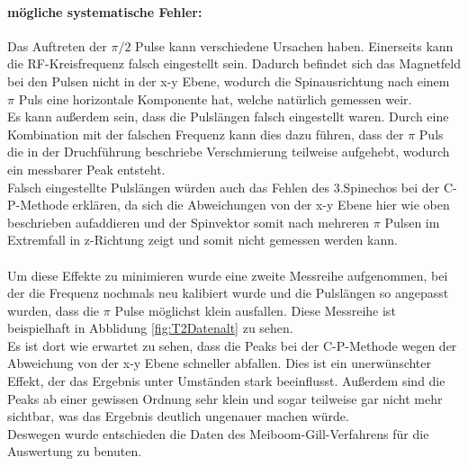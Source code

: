 \documentclass[12pt,a4paper]{article}
\begin{document}
\paragraph{mögliche systematische Fehler:}

Das Auftreten der $\pi/2$ Pulse kann verschiedene Ursachen haben. Einerseits kann die RF-Kreisfrequenz falsch eingestellt sein. Dadurch befindet sich das Magnetfeld bei den Pulsen nicht in der x-y Ebene, wodurch die Spinausrichtung nach einem $\pi$ Puls eine horizontale Komponente hat, welche natürlich gemessen weir.\\
Es kann außerdem sein, dass die Pulslängen falsch eingestellt waren. Durch eine Kombination mit der falschen Frequenz kann dies dazu führen, dass der $\pi$ Puls die in der Druchführung beschriebe Verschmierung teilweise aufgehebt, wodurch ein messbarer Peak entsteht.\\
Falsch eingestellte Pulslängen würden auch das Fehlen des 3.Spinechos  bei der C-P-Methode erklären, da sich die Abweichungen von der x-y Ebene hier wie oben beschrieben aufaddieren und der Spinvektor somit nach mehreren $\pi$ Pulsen im Extremfall in z-Richtung zeigt und somit nicht gemessen werden kann.\\
\\
Um diese Effekte zu minimieren wurde eine zweite Messreihe aufgenommen, bei der die Frequenz nochmals neu kalibiert wurde und die Pulslängen so angepasst wurden, dass die $\pi$ Pulse möglichst klein ausfallen. Diese Messreihe ist beispielhaft in Abblidung \ref{fig:T2Datenalt} zu sehen.\\
Es ist dort wie erwartet zu sehen, dass die Peaks bei der C-P-Methode wegen der Abweichung von der x-y Ebene schneller abfallen. Dies ist ein unerwünschter Effekt, der das Ergebnis unter Umständen stark beeinflusst. Außerdem sind die Peaks ab einer gewissen Ordnung sehr klein und sogar teilweise gar nicht mehr sichtbar, was das Ergebnis deutlich ungenauer machen würde.\\
Deswegen wurde entschieden die Daten des Meiboom-Gill-Verfahrens für die Auswertung zu benuten.
\end{document}
